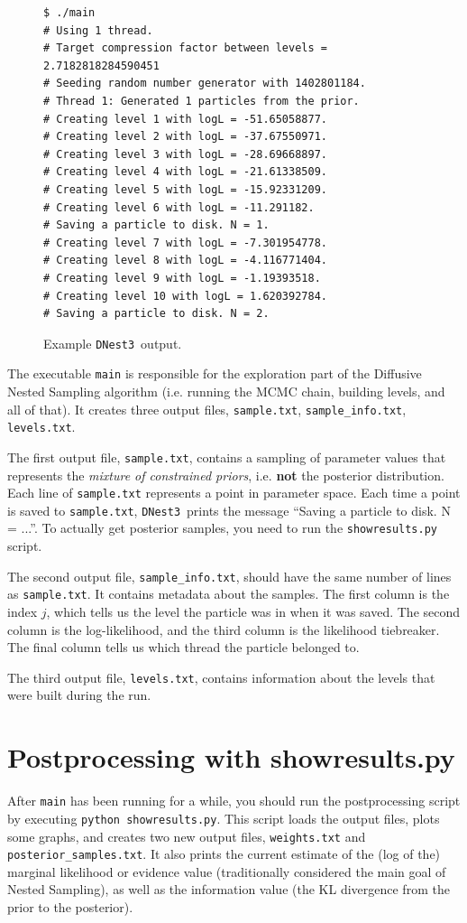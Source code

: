 \documentclass[a4paper, 11pt]{article}
\newcommand{\dnest}{{\tt DNest3}}
\begin{document}
\begin{figure}[h!]
\begin{verbatim}
$ ./main
# Using 1 thread.
# Target compression factor between levels = 2.7182818284590451
# Seeding random number generator with 1402801184.
# Thread 1: Generated 1 particles from the prior.
# Creating level 1 with logL = -51.65058877.
# Creating level 2 with logL = -37.67550971.
# Creating level 3 with logL = -28.69668897.
# Creating level 4 with logL = -21.61338509.
# Creating level 5 with logL = -15.92331209.
# Creating level 6 with logL = -11.291182.
# Saving a particle to disk. N = 1.
# Creating level 7 with logL = -7.301954778.
# Creating level 8 with logL = -4.116771404.
# Creating level 9 with logL = -1.19393518.
# Creating level 10 with logL = 1.620392784.
# Saving a particle to disk. N = 2.
\end{verbatim}
\caption{Example \dnest~output.\label{fig:output}}
\end{figure}

The executable {\tt main} is responsible for the exploration part of the
Diffusive Nested Sampling algorithm (i.e. running the MCMC chain, building
levels, and all of that). It creates three output files,
{\tt sample.txt}, {\tt sample\_info.txt}, {\tt levels.txt}.

The first output
file, {\tt sample.txt}, contains a sampling of parameter values that
represents the {\it mixture of constrained priors}, i.e. {\bf not} the
posterior distribution. Each line of {\tt sample.txt} represents a point in
parameter space. Each time a point is saved to {\tt sample.txt}, \dnest~prints
the message ``Saving a particle to disk. N = ...''. To actually get posterior
samples, you need to run the {\tt showresults.py} script.

The second output file, {\tt sample\_info.txt}, should have the same number of
lines as {\tt sample.txt}. It contains metadata about the samples. The first
column is the index $j$, which tells us the level the particle was in when it
was saved. The second column is the log-likelihood, and the third column is
the likelihood tiebreaker. The final column tells us which thread the particle
belonged to.

The third output file, {\tt levels.txt}, contains information about the levels
that were built during the run.

\section{Postprocessing with showresults.py}
After {\tt main} has been running for
a while, you should run the postprocessing script
by executing {\tt python showresults.py}. This script loads the output files,
plots some graphs, and creates two new output files, {\tt weights.txt} and
{\tt posterior\_samples.txt}. It also prints the current estimate of the
(log of the) marginal likelihood or evidence value (traditionally considered
the main goal of Nested Sampling), as well as the information value (the KL
divergence from the prior to the posterior).
\end{document}
